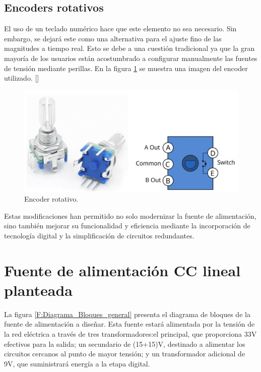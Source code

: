 \subsection{Encoders rotativos}\par 
El uso de un teclado numérico hace que este elemento no sea necesario. Sin embargo, se dejará este como una alternativa para el ajuste fino de las magnitudes a tiempo real. Esto se debe a una cuestión tradicional ya que la gran mayoría de los usuarios están acostumbrado a configurar manualmente las fuentes de tensión mediante perillas. En la figura \ref{F:encoder_rotativo} se muestra una imagen del encoder utilizado. [\cite{Encoder}] \par
\begin{figure}[H]
    \centering
    \includegraphics[scale=0.5]{./imagenes/encoder_rotativo.jpg}
    \caption{Encoder rotativo.}
    \label{F:encoder_rotativo}
\end{figure}
\par 
Estas modificaciones han permitido no solo modernizar la fuente de alimentación, sino también mejorar su funcionalidad y eficiencia mediante la incorporación de tecnología digital y la simplificación de circuitos redundantes. \par

\section{Fuente de alimentación CC lineal planteada}

La figura \ref{F:Diagrama_Bloques_general} presenta el diagrama de bloques de la fuente de alimentación a diseñar.  Esta fuente estará alimentada por la tensión de la red eléctrica a través de tres transformadores:el principal, que proporciona 33V efectivos para la salida; un secundario de (15+15)V, destinado a alimentar los circuitos cercanos al punto de mayor tensión; y un transformador adicional de 9V, que suministrará energía a la etapa digital. \par 

